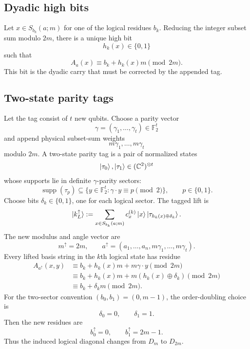 \documentclass[11pt]{article}
\newcommand{\F}{\mathbb F}
\newcommand{\C}{\mathbb C}
\newcommand{\supp}{\operatorname{supp}}
\begin{document}
\subsection{Dyadic high bits}

Let $x\in S_{b_k}(a;m)$ for one of the logical residues $b_k$.  Reducing the integer subset sum
modulo $2m$, there is a unique high bit
\begin{equation}
  h_k(x)\in\{0,1\}
  \label{eq:high-bit-general}
\end{equation}
such that
\begin{equation}
  A_a(x)\equiv b_k+h_k(x)m\pmod{2m}.
  \label{eq:high-bit-residue}
\end{equation}
This bit is the dyadic carry that must be corrected by the appended tag.

\subsection{Two-state parity tags}

Let the tag consist of $t$ new qubits.  Choose a parity vector
\[
  \gamma=(\gamma_1,\ldots,\gamma_t)\in\F_2^t
\]
and append physical subset-sum weights
\[
  m\gamma_1,\ldots,m\gamma_t
\]
modulo $2m$.  A two-state parity tag is a pair of normalized states
\[
  \ket{\tau_0},\ket{\tau_1}\in(\C^2)^{\otimes t}
\]
whose supports lie in definite $\gamma$-parity sectors:
\begin{equation}
  \supp(\tau_p)\subseteq \{y\in\F_2^t: \gamma\cdot y\equiv p\pmod2\},
  \qquad p\in\{0,1\}.
  \label{eq:tag-parity-support}
\end{equation}
Choose bits $\delta_k\in\{0,1\}$, one for each logical sector.  The tagged lift is
\begin{equation}
  \ket{k_L^{\uparrow}}
  :=\sum_{x\in S_{b_k}(a;m)} c^{(k)}_x\ket{x}\ket{\tau_{h_k(x)\oplus\delta_k}}.
  \label{eq:two-state-tag-lift}
\end{equation}
The new modulus and angle vector are
\begin{equation}
  m^{\uparrow}=2m,
  \qquad
  a^{\uparrow}=(a_1,\ldots,a_n,m\gamma_1,\ldots,m\gamma_t).
  \label{eq:general-tag-angle}
\end{equation}
Every lifted basis string in the $k$th logical state has residue
\begin{align}
  A_{a^{\uparrow}}(x,y)
  &\equiv b_k+h_k(x)m+m\gamma\cdot y\pmod{2m} \nonumber\\
  &\equiv b_k+h_k(x)m+m(h_k(x)\oplus\delta_k)\pmod{2m} \nonumber\\
  &\equiv b_k+\delta_k m\pmod{2m}.
  \label{eq:tag-residue-computation}
\end{align}
For the two-sector convention $(b_0,b_1)=(0,m-1)$, the order-doubling choice is
\begin{equation}
  \delta_0=0,
  \qquad
  \delta_1=1.
  \label{eq:delta-order-doubling}
\end{equation}
Then the new residues are
\begin{equation}
  b_0^{\uparrow}=0,
  \qquad
  b_1^{\uparrow}=2m-1.
  \label{eq:new-residues-two-sector}
\end{equation}
Thus the induced logical diagonal changes from $D_m$ to $D_{2m}$.
\end{document}
